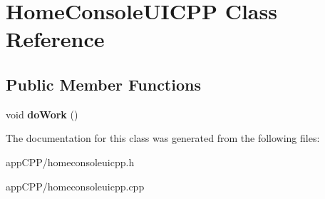 \hypertarget{classHomeConsoleUICPP}{\section{Home\-Console\-U\-I\-C\-P\-P Class Reference}
\label{classHomeConsoleUICPP}
}
\subsection*{Public Member Functions}
\begin{DoxyCompactItemize}
\item 
\hypertarget{classHomeConsoleUICPP_a021880cafb412c494569b845dbf8962d}{void {\bfseries do\-Work} ()}\label{classHomeConsoleUICPP_a021880cafb412c494569b845dbf8962d}

\end{DoxyCompactItemize}


The documentation for this class was generated from the following files\-:\begin{DoxyCompactItemize}
\item 
app\-C\-P\-P/homeconsoleuicpp.\-h\item 
app\-C\-P\-P/homeconsoleuicpp.\-cpp\end{DoxyCompactItemize}

